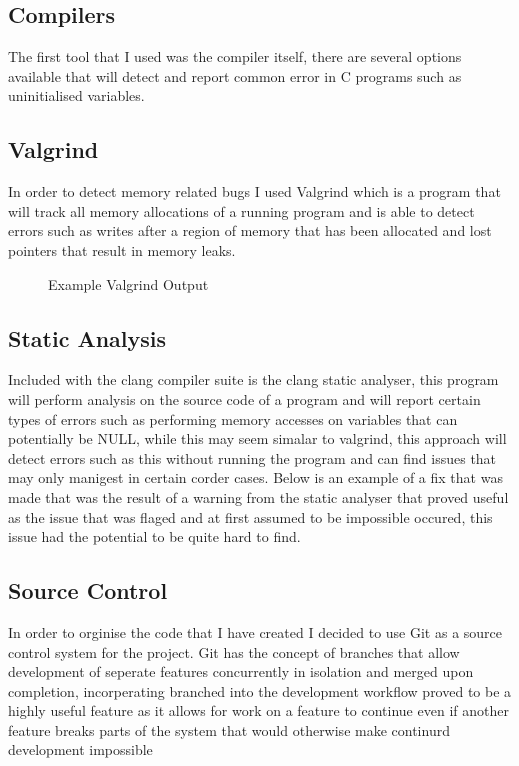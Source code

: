 \subsection{Compilers}

The first tool that I used was the compiler itself, there are several options available that will detect and report
common error in C programs such as uninitialised variables.

\subsection{Valgrind}
In order to detect memory related bugs I used Valgrind which is a program that will track all memory allocations
of a running program and is able to detect errors such as writes after a region of memory that has been allocated
and lost pointers that result in memory leaks.

\begin{figure}

\label{fig:valgrind_listing}
\caption{Example Valgrind Output}
\end{figure}

\subsection{Static Analysis}
Included with the clang compiler suite is the clang static analyser, this program will perform analysis on the
source code of a program and will report certain types of errors such as performing memory accesses on variables
that can potentially be NULL, while this may seem simalar to valgrind, this approach will detect errors such
as this without running the program and can find issues that may only manigest in certain corder cases. Below
is an example of a fix that was made that was the result of a warning from the static analyser that proved
useful as the issue that was flaged and at first assumed to be impossible occured, this issue had the potential
to be quite hard to find.

\subsection{Source Control}
In order to orginise the code that I have created I decided to use Git as a source control system for the project.
Git has the concept of branches that allow development of seperate features concurrently in isolation and
merged upon completion, incorperating branched into the development workflow proved to be a highly useful feature
as it allows for work on a feature to continue even if another feature breaks parts of the system that would
otherwise make continurd development impossible

